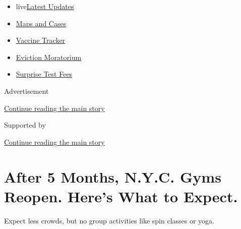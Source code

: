 \begin{itemize}
\tightlist
\item
  live\href{https://www.nytimes3xbfgragh.onion/2020/09/09/world/covid-19-coronavirus.html?name=styln-coronavirus-national\&region=TOP_BANNER\&block=storyline_menu_recirc\&action=click\&pgtype=Article\&impression_id=a796d5e1-f2a4-11ea-9745-87ca264dc7a7\&variant=undefined}{Latest
  Updates}
\item
  \href{https://www.nytimes3xbfgragh.onion/interactive/2020/us/coronavirus-us-cases.html?name=styln-coronavirus-national\&region=TOP_BANNER\&block=storyline_menu_recirc\&action=click\&pgtype=Article\&impression_id=a796fcf0-f2a4-11ea-9745-87ca264dc7a7\&variant=undefined}{Maps
  and Cases}
\item
  \href{https://www.nytimes3xbfgragh.onion/interactive/2020/science/coronavirus-vaccine-tracker.html?name=styln-coronavirus-national\&region=TOP_BANNER\&block=storyline_menu_recirc\&action=click\&pgtype=Article\&impression_id=a796fcf1-f2a4-11ea-9745-87ca264dc7a7\&variant=undefined}{Vaccine
  Tracker}
\item
  \href{https://www.nytimes3xbfgragh.onion/2020/09/02/your-money/eviction-moratorium-covid.html?name=styln-coronavirus-national\&region=TOP_BANNER\&block=storyline_menu_recirc\&action=click\&pgtype=Article\&impression_id=a796fcf2-f2a4-11ea-9745-87ca264dc7a7\&variant=undefined}{Eviction
  Moratorium}
\item
  \href{https://www.nytimes3xbfgragh.onion/2020/09/09/upshot/coronavirus-surprise-test-fees.html?name=styln-coronavirus-national\&region=TOP_BANNER\&block=storyline_menu_recirc\&action=click\&pgtype=Article\&impression_id=a796fcf3-f2a4-11ea-9745-87ca264dc7a7\&variant=undefined}{Surprise
  Test Fees}
\end{itemize}

Advertisement

\protect\hyperlink{after-top}{Continue reading the main story}

Supported by

\protect\hyperlink{after-sponsor}{Continue reading the main story}

\hypertarget{after-5-months-nyc-gyms-reopen-heres-what-to-expect}{%
\section{After 5 Months, N.Y.C. Gyms Reopen. Here's What to
Expect.}\label{after-5-months-nyc-gyms-reopen-heres-what-to-expect}}

Expect less crowds, but no group activities like spin classes or yoga.


